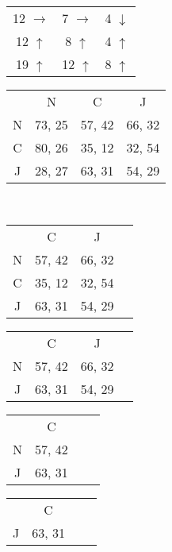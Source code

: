 \documentclass[12pt]{article}
\begin{document}
\problemasub
\begin{tabular}{ccc}
    12 $\rightarrow$ & 7 $\rightarrow$ & 4 $\downarrow$ \\
    12 $\uparrow$ & 8 $\uparrow$ & 4 $\uparrow$ \\
    19 $\uparrow$ & 12 $\uparrow$ & 8 $\uparrow$
\end{tabular}

\newpage

\problem

\begin{tabular}{cccc}
    {}   & N      & C      & J      \\
    N    & 73, 25 & 57, 42 & 66, 32 \\
    C    & 80, 26 & 35, 12 & 32, 54 \\
    J    & 28, 27 & 63, 31 & 54, 29 \\
\end{tabular} \vspace{5mm} \\

\begin{tabular}{cccc}
    {}   & C      & J      \\
    N    & 57, 42 & 66, 32 \\
    C    & 35, 12 & 32, 54 \\
    J    & 63, 31 & 54, 29 \\
\end{tabular} \vspace{5mm}

\begin{tabular}{cccc}
    {}   & C      & J      \\
    N    & 57, 42 & 66, 32 \\
    J    & 63, 31 & 54, 29 \\
\end{tabular} \vspace{5mm}

\begin{tabular}{cccc}
    {}   & C      \\
    N    & 57, 42 \\
    J    & 63, 31 \\
\end{tabular} \vspace{5mm}

\begin{tabular}{cccc}
    {}   & C      \\
    J    & 63, 31 \\
\end{tabular} \vspace{5mm} \\
\end{document}
